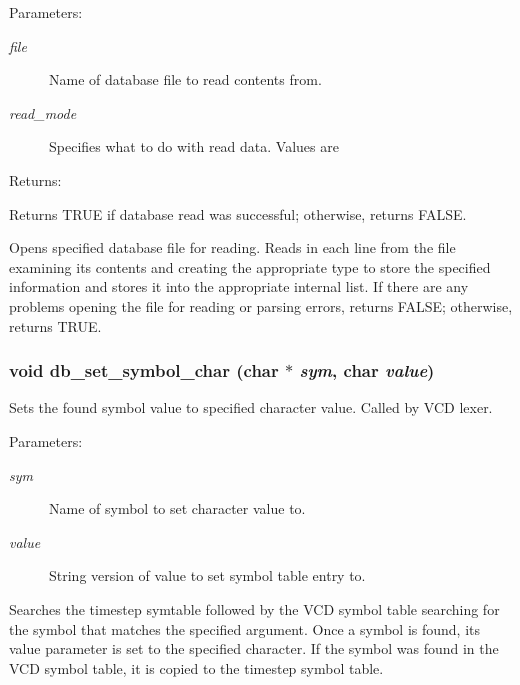 \begin{Desc}
\item[Parameters: ]\par
\begin{description}
\item[{\em 
file}]Name of database file to read contents from. \item[{\em 
read\_\-mode}]Specifies what to do with read data. Values are
\end{description}
\end{Desc}
\begin{Desc}
\item[Returns: ]\par
Returns TRUE if database read was successful; otherwise, returns FALSE.\end{Desc}
Opens specified database file for reading. Reads in each line from the file examining its contents and creating the appropriate type to store the specified information and stores it into the appropriate internal list. If there are any problems opening the file for reading or parsing errors, returns FALSE; otherwise, returns TRUE. 
\subsubsection{\setlength{\rightskip}{0pt plus 5cm}void db\_\-set\_\-symbol\_\-char (char $\ast$ {\em sym}, char {\em value})}\label{db_8c_a32}


Sets the found symbol value to specified character value. Called by VCD lexer.

\begin{Desc}
\item[Parameters: ]\par
\begin{description}
\item[{\em 
sym}]Name of symbol to set character value to. \item[{\em 
value}]String version of value to set symbol table entry to.\end{description}
\end{Desc}
Searches the timestep symtable followed by the VCD symbol table searching for the symbol that matches the specified argument. Once a symbol is found, its value parameter is set to the specified character. If the symbol was found in the VCD symbol table, it is copied to the timestep symbol table. 
